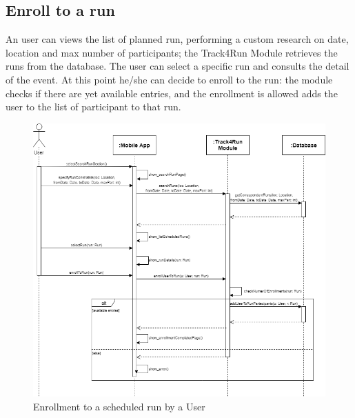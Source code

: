 \subsection{ Enroll to a run}
An user can views the list of planned run, performing a custom research on date, location and max number of participants; the Track4Run Module retrieves the runs from the database. The user can select a specific run and consults the detail of the event. At this point he/she can decide to enroll to the run: the module checks if there are yet available entries, and the enrollment is allowed adds the user to the list of participant to that run.

\begin{figure}[H]
    \centering
    \includegraphics[scale=0.35]{DD/Pictures/enrollSeqDiagDD.png}
    \caption{Enrollment to a scheduled run by a User}
\end{figure}